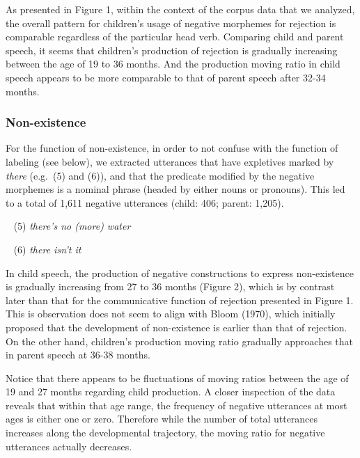 \documentclass[10pt, letterpaper]{article}
\begin{document}
As presented in Figure 1, within the context of the corpus data that we
analyzed, the overall pattern for children's usage of negative morphemes
for rejection is comparable regardless of the particular head verb.
Comparing child and parent speech, it seems that children's production
of rejection is gradually increasing between the age of 19 to 36 months.
And the production moving ratio in child speech appears to be more
comparable to that of parent speech after 32-34 months.

\hypertarget{non-existence}{%
\subsubsection{Non-existence}\label{non-existence}}

For the function of non-existence, in order to not confuse with the
function of labeling (see below), we extracted utterances that have
expletives marked by \emph{there} (e.g.~(5) and (6)), and that the
predicate modified by the negative morphemes is a nominal phrase (headed
by either nouns or pronouns). This led to a total of 1,611 negative
utterances (child: 406; parent: 1,205).

~ (5) \emph{there's no (more) water}

~ (6) \emph{there isn't it}

In child speech, the production of negative constructions to express
non-existence is gradually increasing from 27 to 36 months (Figure 2),
which is by contrast later than that for the communicative function of
rejection presented in Figure 1. This is observation does not seem to
align with Bloom (1970), which initially proposed that the development
of non-existence is earlier than that of rejection. On the other hand,
children's production moving ratio gradually approaches that in parent
speech at 36-38 months.

Notice that there appears to be fluctuations of moving ratios between
the age of 19 and 27 months regarding child production. A closer
inspection of the data reveals that within that age range, the frequency
of negative utterances at most ages is either one or zero. Therefore
while the number of total utterances increases along the developmental
trajectory, the moving ratio for negative utterances actually decreases.
\end{document}

